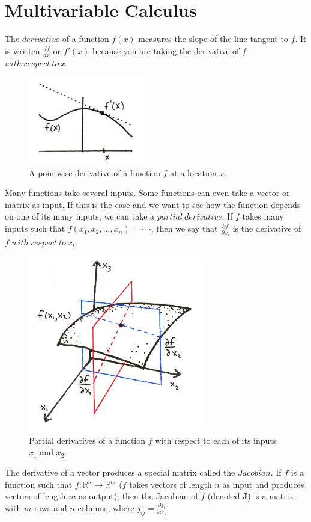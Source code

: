 \documentclass[a4paper]{article}
\begin{document}
\section{Multivariable Calculus}
The $derivative$ of a function $f(x)$ measures the slope of the line tangent to $f$. It is written $\frac{df}{dx}$ or $f'(x)$ because you are taking the derivative of $f$ $with\ respect\ to\ x$. 
\begin{figure}[H]
  \centering
  \includegraphics[width=2in]{figures/chap1/derivative}
  \caption{A pointwise derivative of a function $f$ at a location $x$.}
\end{figure}
\noindent Many functions take several inputs. Some functions can even take a vector or matrix as input. If this is the case and we want to see how the function depends on one of its many inputs, we can take a $partial\ derivative$. If $f$ takes many inputs such that $f(x_1, x_2, ..., x_n) = \cdot \cdot\cdot$, then we say that $\frac{\partial f}{\partial x_i}$ is the derivative of $f$ $with\ respect\ to\ x_i$. 
\begin{figure}[H]
  \centering
  \includegraphics[width=3in]{figures/chap1/partial}
  \caption{Partial derivatives of a function $f$ with respect to each of its inputs $x_1$ and $x_2$.}
\end{figure}
\noindent The derivative of a vector produces a special matrix called the $Jacobian$. If $f$ is a function such that $f: \mathbb{R}^n \rightarrow \mathbb{R}^m$ ($f$ takes vectors of length $n$ as input and produces vectors of length $m$ as output), then the Jacobian of $f$ (denoted $\bm{J}$) is a matrix with $m$ rows and $n$ columns, where $j_{ij} = \frac{\partial f_i}{\partial x_j}$. 
\end{document}
